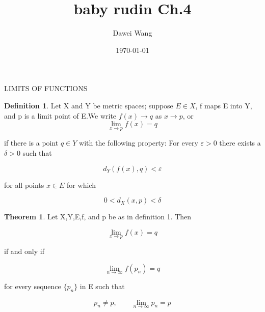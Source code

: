 \documentclass{article}
\date{\today}
\title{baby rudin Ch.4}
\author{Dawei Wang}
\theoremstyle{definition}
\newtheorem{defi}{Definition}
\newtheorem{theo}{Theorem}
\theoremstyle{remark}
\begin{document}
	\maketitle
LIMITS OF FUNCTIONS
\begin{defi}
Let X and Y be metric spaces; suppose $E\in X$, f maps E into Y, and p is a limit point of E.We write $f(x)\rightarrow q$ as $x\rightarrow p$, or 
\[
\lim_{x\rightarrow p}f(x)=q
\]

if there is a point $q\in Y$ with the following property: For every  
$\varepsilon>0$ there exists a $\delta>0$ such that

\[
d_Y(f(x),q)<\varepsilon
\]

for all points $x\in E$ for which

\[
0<d_X(x,p)<\delta
\]
\end{defi}

\begin{theo}
	Let X,Y,E,f, and p be as in definition 1. Then
	
	\[
	\lim_{x\rightarrow p}f(x)=q
	\]
	
	if and only if 
	
	\[
	\lim_{n\rightarrow \infty}f(p_n)=q
	\]
	
	for every sequence $\{p_n\}$ in E such that 
	
	\[
	p_n\ne p,\qquad \lim_{n\rightarrow\infty} p_n=p
	\]
	
\end{theo}
\end{document}
